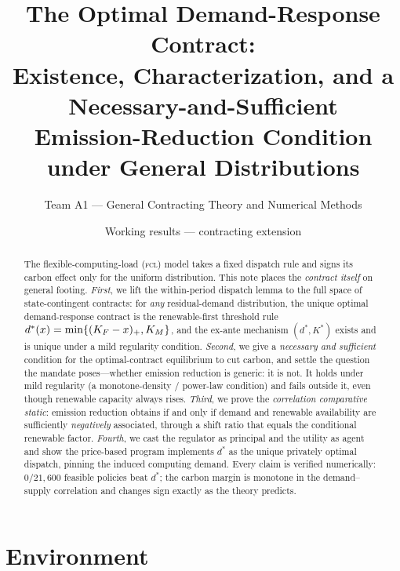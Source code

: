 \documentclass[11pt,reqno]{amsart}
\theoremstyle{plain}
\theoremstyle{definition}
\theoremstyle{remark}
\newcommand{\dstar}{d^{*}}
\begin{document}
\title[The Optimal Demand-Response Contract]
{The Optimal Demand-Response Contract:\\
Existence, Characterization, and a Necessary-and-Sufficient\\
Emission-Reduction Condition under General Distributions}
\author{Team A1 --- General Contracting Theory and Numerical Methods}
\date{Working results --- contracting extension}

\begin{abstract}
The flexible-computing-load (\textsc{fcl}) model takes a fixed dispatch rule and
signs its carbon effect only for the uniform distribution. This note places the
\emph{contract itself} on general footing. \emph{First}, we lift the within-period
dispatch lemma to the full space of state-contingent contracts: for \emph{any}
residual-demand distribution, the unique optimal demand-response contract is the
renewable-first threshold rule $\dstar(x)=\min\{(\KF-x)_+,\KM\}$, and the ex-ante
mechanism $(\dstar,K^{*})$ exists and is unique under a mild regularity condition.
\emph{Second}, we give a \emph{necessary and sufficient} condition for the
optimal-contract equilibrium to cut carbon, and settle the question the mandate
poses---whether emission reduction is generic: it is not. It holds under mild
regularity (a monotone-density / power-law condition) and fails outside it, even
though renewable capacity always rises. \emph{Third}, we prove the
\emph{correlation comparative static}: emission reduction obtains if and only if
demand and renewable availability are sufficiently \emph{negatively} associated,
through a shift ratio that equals the conditional renewable factor. \emph{Fourth},
we cast the regulator as principal and the utility as agent and show the
price-based program implements $\dstar$ as the unique privately optimal dispatch,
pinning the induced computing demand. Every claim is verified numerically:
$0/21{,}600$ feasible policies beat $\dstar$; the carbon margin is monotone in the
demand--supply correlation and changes sign exactly as the theory predicts.
\end{abstract}

\maketitle

\section{Environment}\label{sec:env}
\end{document}
